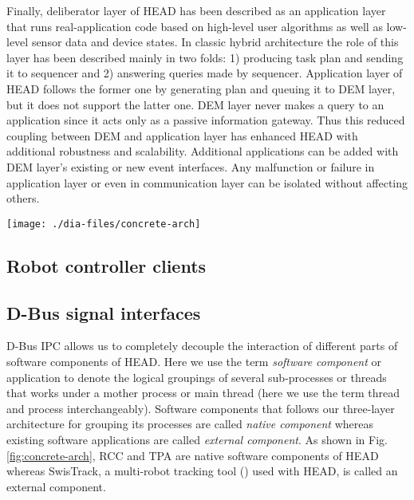 Finally, deliberator layer of HEAD has been described as an application layer that runs real-application code based on high-level user algorithms as well as low-level sensor data and device states. In classic hybrid architecture the role of this layer has been described mainly in two folds: 1) producing task plan and sending it to sequencer and 2) answering queries made by sequencer. Application layer of HEAD follows the former one by generating plan and queuing it to DEM layer, but it does not support the latter one. DEM layer never makes a query to an application since it acts only as a passive information gateway. Thus this reduced coupling between DEM and application layer has enhanced HEAD with additional robustness and scalability. Additional applications can be added with DEM layer's existing or new event interfaces. Any malfunction or failure in application layer or even in communication layer can be isolated without affecting others. 
\begin{figure*}
\begin{center}
\texttt{[image: ./dia-files/concrete-arch]} %
\caption{General outline of {\em HEAD}.}
\label{fig:concrete-arch}
\end{center}
\end{figure*}
\subsection{Robot controller clients}
\subsection{D-Bus signal interfaces}
D-Bus IPC allows us to completely decouple the interaction of different parts of software components of HEAD. Here we use the term {\em software component} or application to denote the logical groupings of several sub-processes or threads that works under a mother process or main thread (here we use the term thread and process interchangeably). Software components that follows our three-layer architecture for grouping its processes are called {\em native component} whereas existing software applications are called {\em external component}. As shown in Fig. \ref{fig:concrete-arch}, RCC and TPA are native software components of HEAD whereas SwisTrack, a multi-robot tracking tool (\cite{Lochmatter+2008}) used with HEAD, is called an external component.
